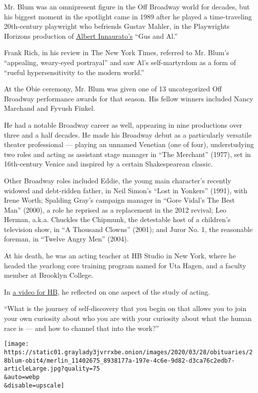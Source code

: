 Mr. Blum was an omnipresent figure in the Off Broadway world for
decades, but his biggest moment in the spotlight came in 1989 after he
played a time-traveling 20th-century playwright who befriends Gustav
Mahler, in the Playwrights Horizons production of
\href{https://www.nytimes3xbfgragh.onion/2017/09/27/theater/albert-innaurato-dead-playwright-who-had-hits-on-broadway-in-70s.html}{Albert
Innaurato's} ``Gus and Al.''

Frank Rich, in his review in The New York Times, referred to Mr. Blum's
``appealing, weary-eyed portrayal'' and saw Al's self-martyrdom as a
form of ``rueful hypersensitivity to the modern world.''

At the Obie ceremony, Mr. Blum was given one of 13 uncategorized Off
Broadway performance awards for that season. His fellow winners included
Nancy Marchand and Fyvush Finkel.

He had a notable Broadway career as well, appearing in nine productions
over three and a half decades. He made his Broadway debut as a
particularly versatile theater professional --- playing an unnamed
Venetian (one of four), understudying two roles and acting as assistant
stage manager in ``The Merchant'' (1977), set in 16th-century Venice and
inspired by a certain Shakespearean classic.

Other Broadway roles included Eddie, the young main character's recently
widowed and debt-ridden father, in Neil Simon's ``Lost in Yonkers''
(1991), with Irene Worth; Spalding Gray's campaign manager in ``Gore
Vidal's The Best Man'' (2000), a role he reprised as a replacement in
the 2012 revival; Leo Herman, a.k.a. Chuckles the Chipmunk, the
detestable host of a children's television show, in ``A Thousand
Clowns'' (2001); and Juror No. 1, the reasonable foreman, in ``Twelve
Angry Men'' (2004).

At his death, he was an acting teacher at HB Studio in New York, where
he headed the yearlong core training program named for Uta Hagen, and a
faculty member at Brooklyn College.

In \href{https://www.youtube.com/watch?v=ljmH5R2qCjo}{a video for HB},
he reflected on one aspect of the study of acting.

``What is the journey of self-discovery that you begin on that allows
you to join your own curiosity about who you are with your curiosity
about what the human race is --- and how to channel that into the
work?''

\texttt{[image: https://static01.graylady3jvrrxbe.onion/images/2020/03/28/obituaries/28blum-obit4/merlin\_11402675\_8938177a-197e-4c6e-9d82-d3ca76c2edb7-articleLarge.jpg?quality=75\\\&auto=webp\\\&disable=upscale]}

